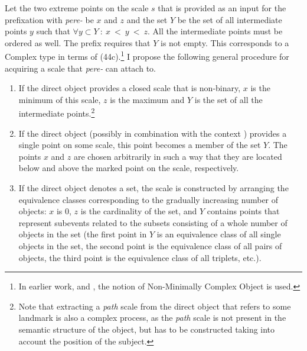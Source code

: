 Let the two extreme points on the scale $s$ that is provided as an input for the prefixation  with \textit{pere-}   be $x$ and $z$ and the set $Y$ be the set of all intermediate points $y$ such that $\forall y \subset Y~:~x~<~y~<~z$. All the intermediate points must be ordered as well. The prefix requires that $Y$ is not empty. This corresponds to a Complex type in terms of \citealt{Beavers:12} (44c).\footnote{In earlier work, \citealt{Beavers:02} and \citealt{Beavers:08}, the notion of Non-Minimally Complex Object is used.} I propose the following general procedure for acquiring a scale that \textit{pere-}   can attach to. 
\begin{enumerate}
\item If the direct object provides a closed scale that is non-binary, $x$ is the minimum of this scale, $z$ is the maximum and $Y$ is the set of all the intermediate points.\footnote{Note that extracting a \textit{path} scale from the direct object that refers to some landmark is also a complex process, as the \textit{path} scale is not present in the semantic structure of the object, but has to be constructed taking into account the position of the subject.}
\item If the direct object (possibly in combination with the context  ) provides a single point on some scale, this point becomes a member of the set $Y$. The points $x$ and $z$ are chosen arbitrarily in such a way that they are located below and above the marked point on the scale, respectively. 
\item If the direct object denotes a set, the scale is constructed by arranging the equivalence classes corresponding to the gradually increasing number of objects: $x$ is 0, $z$ is the cardinality of the set, and $Y$ contains points that represent subevents related to the subsets consisting of a whole number of objects in the set (the first point in $Y$ is an equivalence class of all single objects in the set, the second point is the equivalence class of all pairs of objects, the third point is the equivalence class of all triplets, etc.).

\end{enumerate}
